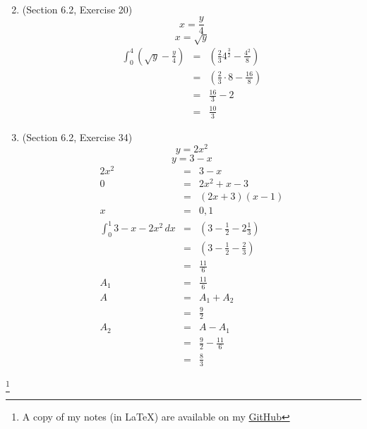 \documentclass{article}
\newcommand\blfootnote[1]{
    \begingroup
    \renewcommand\thefootnote{}\footnote{#1}
    \addtocounter{footnote}{-1}
    \endgroup
}
\begin{document}
\begin{enumerate}
\begin{eqnarray}
        \end{eqnarray}
    \item (Section 6.2, Exercise 20)
        $$x = \frac{y}{4}$$
        $$x = \sqrt{y}$$
        \begin{eqnarray}
            \int_0^4{\left(\sqrt{y} - \frac{y}{4}\right)} &=& \left(\frac{2}{3}4^{\frac{3}{2}} - \frac{4^2}{8}\right) \\
                                                          &=& \left(\frac{2}{3}\cdot8 - \frac{16}{8}\right) \\
                                                          &=& \frac{16}{3} - 2 \\
                                                          &=& \frac{10}{3}
        \end{eqnarray}
    \item (Section 6.2, Exercise 34)
        $$y = 2x^2$$
        $$y = 3 - x$$
        \begin{eqnarray}
            2x^2 &=& 3 - x \\
            0 &=& 2x^2 + x - 3 \\
              &=& \left(2x + 3\right)\left(x - 1\right) \\
            x &=& 0, 1 \\
            \int_0^1{3 - x - 2x^2\,dx} &=& \left(3 - \frac{1}{2} - 2\frac{1}{3}\right) \\
                                       &=& \left(3 - \frac{1}{2} - \frac{2}{3}\right) \\
                                       &=& \frac{11}{6} \\
            A_1 &=& \frac{11}{6} \\
            A &=& A_1 + A_2 \\
              &=& \frac{9}{2} \\
            A_2 &=& A - A_1 \\
                &=& \frac{9}{2} - \frac{11}{6} \\
                &=& \frac{8}{3}
        \end{eqnarray}
\end{enumerate}

\blfootnote{A copy of my notes (in \LaTeX) are available on my \href{https://github.com/onlinechronically/MATH-211}{GitHub}}
\end{document}
